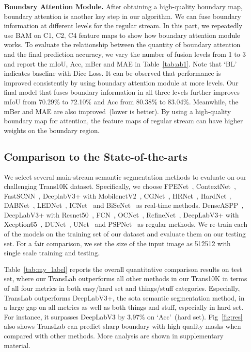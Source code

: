 \documentclass[runningheads]{llncs}
\begin{document}
{    \textbf{Boundary Attention Module.}
    After obtaining a high-quality boundary map, boundary attention is another key step in our algorithm.
    We can fuse boundary information at different levels for the regular stream.
    In this part, we repeatedly use BAM on C1, C2, C4 feature maps to show how boundary attention module works.
    To evaluate the relationship between the quantity of boundary attention and the final prediction accuracy, we vary the number of fusion levels from 1 to 3 and report the mIoU, Acc, mBer and MAE in Table~\ref{tab:ab1}.
    Note that `BL' indicates baseline with Dice Loss.
    It can be observed that performance is improved consistently by using boundary attention module at more levels.
    Our final model that fuses boundary information in all three levels further improves mIoU from 70.29\% to 72.10\% and Acc from 80.38\% to 83.04\%. Meanwhile, the mBer and MAE are also improved~(lower is better).
    By using a high-quality boundary map for attention, the feature maps of regular stream can have higher weights on the boundary region.


    \subsection{Comparison to the State-of-the-arts}
    We select several main-stream semantic segmentation methods to evaluate on our challenging Trans10K dataset.
    Specifically, we choose FPENet~\cite{fpenet}, ContextNet~\cite{contextnet}, FastSCNN~\cite{fastscnn}, DeeplabV3+ with MobilenetV2~\cite{deeplabv3+}, CGNet~\cite{cgnet}, HRNet~\cite{hrnet}, HardNet~\cite{hardnet}, DABNet~\cite{dabnet}, LEDNet~\cite{lednet}, ICNet~\cite{icnet} and BiSeNet~\cite{bisenet} as real-time methods.
DenseASPP~\cite{denseaspp}, DeepLabV3+ with Resnet50~\cite{deeplabv3+},  FCN~\cite{fcn}, OCNet~\cite{ocnet}, RefineNet~\cite{refinenet}, DeepLabV3+ with Xception65~\cite{deeplabv3+}, DUNet~\cite{dunet}, UNet~\cite{unet} and PSPNet~\cite{pspnet} as regular methods.
We re-train each of the models on the training set of our dataset and evaluate them on our testing set. For a fair comparison, we set the size of the input image as 512512 with single scale training and testing.

    Table~\ref{tab:my_label} reports the overall quantitative comparison results on test set, where our TransLab outperforms all other methods in our Trans10K in terms of all four metrics in both easy/hard set and things/stuff categories.
    Especially, TransLab outperforms DeepLabV3+, the sota semantic segmentation method, in a large gap on all metrics as well as both things and stuff, especially in hard set.
    For instance, it surpasses DeepLabV3 by 3.97\% on `Acc'~(hard set). Fig~\ref{fig:res} also shows TransLab can predict sharp boundary with high-quality masks when compared with other methods. More analysis are shown in supplementary material.



}
\end{document}
